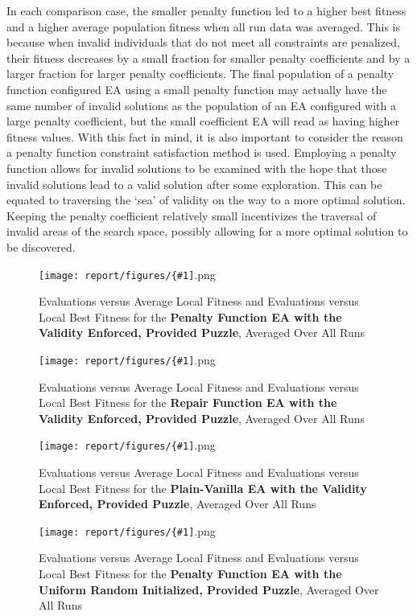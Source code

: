 \documentclass[11pt]{article}
\newcommand{\fitnessplotcaption}[1]{\caption{Evaluations versus Average Local Fitness and Evaluations versus 
    Local Best Fitness for the \textbf{{#1}}, Averaged Over All Runs}}
\newcommand{\addgraphic}[1]{\centerline{\texttt{[image: report/figures/\{\#1]}.png}}}
\begin{document}
In each comparison case, the smaller penalty function led to a higher best fitness and a higher average population fitness when
all run data was averaged. This is because when invalid individuals that do not meet all constraints are penalized, their fitness decreases
by a small fraction for smaller penalty coefficients and by a larger fraction for larger penalty coefficients. The final population of a
penalty function configured EA using a small penalty function may actually have the same number of invalid solutions as the population of an
EA configured with a large penalty coefficient, but the small coefficient EA will read as having higher fitness values. With this fact in mind,
it is also important to consider the reason a penalty function constraint satisfaction method is used. Employing a penalty function allows for
invalid solutions to be examined with the hope that those invalid solutions lead to a valid solution after some exploration. This can be 
equated to traversing the `sea' of validity on the way to a more optimal solution. Keeping the penalty coefficient relatively small incentivizes
the traversal of invalid areas of the search space, possibly allowing for a more optimal solution to be discovered.


\begin{figure}
    \addgraphic{website_puzzle_validity_enforced_graph}
    \fitnessplotcaption{Penalty Function EA with the Validity Enforced, Provided Puzzle}
    \label{fig:website_puzzle_validity_enforced_graph}
\end{figure}

\begin{figure}
    \addgraphic{website_puzzle_validity_enforced_bonus_graph}
    \fitnessplotcaption{Repair Function EA with the Validity Enforced, Provided Puzzle}
    \label{fig:website_puzzle_validity_enforced_bonus_graph}
\end{figure}

\begin{figure}
    \addgraphic{website_puzzle_validity_enforced_vanilla_graph}
    \fitnessplotcaption{Plain-Vanilla EA with the Validity Enforced, Provided Puzzle}
    \label{fig:website_puzzle_validity_enforced_vanilla_graph}
\end{figure}

\begin{figure}
    \addgraphic{website_puzzle_uniform_random_graph}
    \fitnessplotcaption{Penalty Function EA with the Uniform Random Initialized, Provided Puzzle}
    \label{fig:website_puzzle_uniform_random_graph}
\end{figure}
\end{document}
